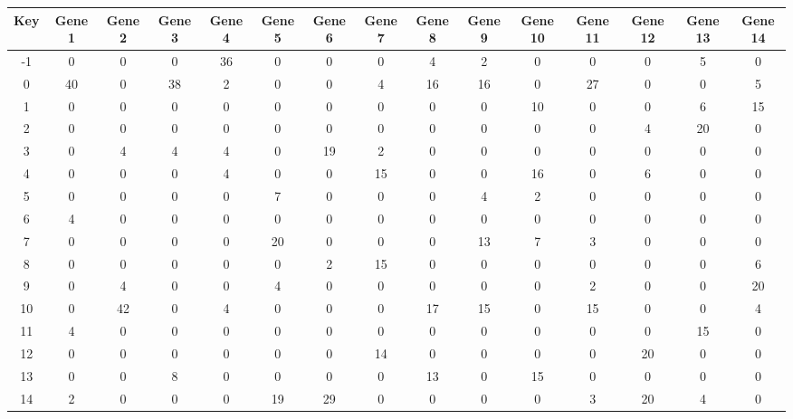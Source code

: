 \begin{tabular}{|c|c|c|c|c|c|c|c|c|c|c|c|c|c|c|}
\hline
Key & Gene 1 & Gene 2 & Gene 3 & Gene 4 & Gene 5 & Gene 6 & Gene 7 & Gene 8 & Gene 9 & Gene 10 & Gene 11 & Gene 12 & Gene 13 & Gene 14 \\
\hline
-1 & 0 & 0 & 0 & 36 & 0 & 0 & 0 & 4 & 2 & 0 & 0 & 0 & 5 & 0 \\
0 & 40 & 0 & 38 & 2 & 0 & 0 & 4 & 16 & 16 & 0 & 27 & 0 & 0 & 5 \\
1 & 0 & 0 & 0 & 0 & 0 & 0 & 0 & 0 & 0 & 10 & 0 & 0 & 6 & 15 \\
2 & 0 & 0 & 0 & 0 & 0 & 0 & 0 & 0 & 0 & 0 & 0 & 4 & 20 & 0 \\
3 & 0 & 4 & 4 & 4 & 0 & 19 & 2 & 0 & 0 & 0 & 0 & 0 & 0 & 0 \\
4 & 0 & 0 & 0 & 4 & 0 & 0 & 15 & 0 & 0 & 16 & 0 & 6 & 0 & 0 \\
5 & 0 & 0 & 0 & 0 & 7 & 0 & 0 & 0 & 4 & 2 & 0 & 0 & 0 & 0 \\
6 & 4 & 0 & 0 & 0 & 0 & 0 & 0 & 0 & 0 & 0 & 0 & 0 & 0 & 0 \\
7 & 0 & 0 & 0 & 0 & 20 & 0 & 0 & 0 & 13 & 7 & 3 & 0 & 0 & 0 \\
8 & 0 & 0 & 0 & 0 & 0 & 2 & 15 & 0 & 0 & 0 & 0 & 0 & 0 & 6 \\
9 & 0 & 4 & 0 & 0 & 4 & 0 & 0 & 0 & 0 & 0 & 2 & 0 & 0 & 20 \\
10 & 0 & 42 & 0 & 4 & 0 & 0 & 0 & 17 & 15 & 0 & 15 & 0 & 0 & 4 \\
11 & 4 & 0 & 0 & 0 & 0 & 0 & 0 & 0 & 0 & 0 & 0 & 0 & 15 & 0 \\
12 & 0 & 0 & 0 & 0 & 0 & 0 & 14 & 0 & 0 & 0 & 0 & 20 & 0 & 0 \\
13 & 0 & 0 & 8 & 0 & 0 & 0 & 0 & 13 & 0 & 15 & 0 & 0 & 0 & 0 \\
14 & 2 & 0 & 0 & 0 & 19 & 29 & 0 & 0 & 0 & 0 & 3 & 20 & 4 & 0 \\
\hline
\end{tabular}